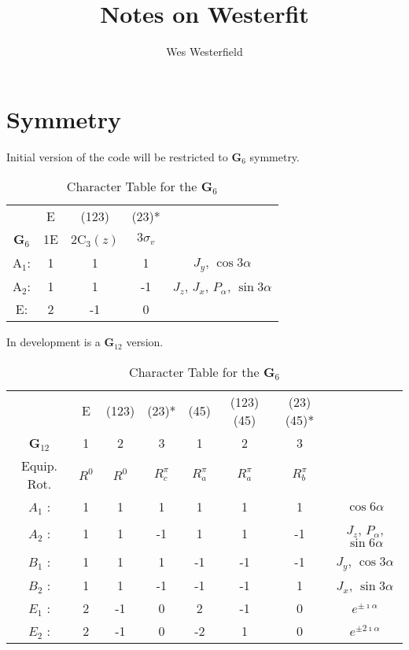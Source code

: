 \documentclass{article}
\title{Notes on  Westerfit}
\author{Wes Westerfield}
\begin{document}
\maketitle


\section{Symmetry}
Initial version of the code will be restricted to \textbf{G}$_{6}$ symmetry. 
\begin{table}[H]
	\centering
	\caption{Character Table for the \textbf{G}$_{6}$}
	\begin{tabular}{c c c c c}
		\hline
		& E & (123) & (23)* & \\
		\textbf{G}$_{6}$ & 1E & 2C$_{3}(z)$ & $3\sigma_{v}$ & \\
		\hline
		A$_{1}$: & 1 & 1 & 1 & $J_{y}$, $\cos3\alpha$ \\
		A$_{2}$: & 1 & 1 & -1 & $J_{z}$, $J_{x}$, $P_{\alpha}$, $\sin3\alpha$ \\
		E: & 2 & -1 & 0 & \\
		\hline
	\end{tabular}
\end{table}

In development is a \textbf{G}$_{12}$ version. 
\begin{table}[H]
\centering
\caption{Character Table for the \textbf{G}$_{6}$}
\begin{tabular}{c c c c c c c c}
	\hline
	& E & (123) & (23)* & (45) & (123)(45) & (23)(45)* & \\
	\textbf{G}$_{12}$ & 1 & 2 & 3 & 1 & 2 & 3 & \\
	Equip. Rot. & $R^{0}$ & $R^{0}$ & $R_{c}^{\pi}$ & $R_{a}^{\pi}$ & $R_{a}^{\pi}$ & $R_{b}^{\pi}$ & \\
	\hline
	$A_{1}$ : & 1 & 1 & 1 & 1 & 1 & 1 & $\cos6\alpha$ \\
	$A_{2}$ : & 1 & 1 &-1 & 1 & 1 &-1 & $J_{z}$, $P_{\alpha}$, $\sin6\alpha$ \\
	$B_{1}$ : & 1 & 1 & 1 &-1 &-1 &-1 & $J_{y}$, $\cos3\alpha$ \\
	$B_{2}$ : & 1 & 1 &-1 &-1 &-1 & 1 & $J_{x}$, $\sin3\alpha$ \\
	$E_{1}$ : & 2 &-1 & 0 & 2 &-1 & 0 & $e^{\pm\imath\alpha}$ \\
	$E_{2}$ : & 2 &-1 & 0 &-2 & 1 & 0 & $e^{\pm2\imath\alpha}$ \\
		\hline
	\end{tabular}
\end{table}
\end{document}
